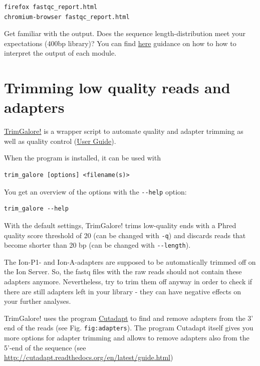 \documentclass[11pt]{article}
\begin{document}
\begin{verbatim}
firefox fastqc_report.html
chromium-browser fastqc_report.html
\end{verbatim}

Get familiar with the output. Does the sequence length-distribution
meet your expectations (400bp library)? You can find \href{http://www.bioinformatics.babraham.ac.uk/projects/fastqc/Help/3\%20Analysis\%20Modules/}{here} guidance on how to how to
interpret the output of each module.

\section{Trimming low quality reads and adapters}
\label{sec-3}


\href{http://www.bioinformatics.babraham.ac.uk/projects/trim_galore/}{TrimGalore!} is a wrapper script to automate quality and adapter
trimming as well as quality control (\href{http://www.bioinformatics.babraham.ac.uk/projects/trim_galore/trim_galore_User_Guide_v0.3.7.pdf}{User Guide}).

When the program is installed, it can be used with 

\begin{verbatim}
trim_galore [options] <filename(s)>
\end{verbatim}

You get an overview of the options with the \texttt{-{}-help} option:

\begin{verbatim}
trim_galore --help
\end{verbatim}

With the default settings, TrimGalore! trims low-quality ends with a
Phred quality score threshold of 20 (can be changed with \texttt{-q}) and
discards reads that become shorter than 20 bp (can be changed with
\texttt{-{}-length}).

The Ion-P1- and Ion-A-adapters are supposed to be automatically
trimmed off on the Ion Server. So, the fastq files with the raw reads
should not contain these adapters anymore. Nevertheless, try to trim them
off anyway in order to check if there are still adapters left in your
library - they can have negative effects on your further analyses.

TrimGalore! uses the program \href{https://code.google.com/p/cutadapt/}{Cutadapt} to find and remove adapters from
the 3' end of the reads (see Fig. \texttt{fig:adapters}). The program Cutadapt
itself gives you more options for adapter trimming and allows to
remove adapters also from the 5'-end of the sequence (see
\url{http://cutadapt.readthedocs.org/en/latest/guide.html})
\end{document}
